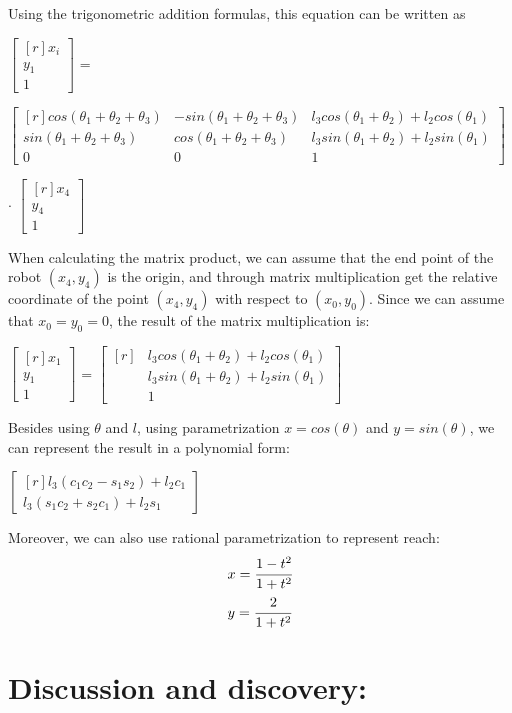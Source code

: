 \documentclass[11pt]{article}
\newcommand{\mat}[1]{
    $\begin{bmatrix*}[r]
        #1
    \end{bmatrix*}$
} %
\newcommand{\myalign}[1]{\begin{align*}#1\end{align*}}
\begin{document}
Using the trigonometric addition formulas, this equation can be written as
\begin{center}
  \mat{
    x_i \\
    y_1 \\
    1
  } = 
  \mat{
    cos(\theta_1+\theta_2+\theta_3) & -sin(\theta_1+\theta_2+\theta_3) & l_3cos(\theta_1+\theta_2) + l_2cos(\theta_1) \\
    sin(\theta_1+\theta_2+\theta_3) & cos(\theta_1+\theta_2+\theta_3) & l_3sin(\theta_1+\theta_2) + l_2sin(\theta_1) \\
    0 & 0 & 1
  }
  $\cdot$ \mat{
    x_{4} \\
    y_{4} \\
    1
  }
\end{center}
When calculating the matrix product, we can assume that the end point of the robot $(x_4, y_4)$ is the origin,
and through matrix multiplication get the relative coordinate of the point $(x_4, y_4)$ with respect to $(x_0, y_0)$.
Since we can assume that $x_0 = y_0 = 0$, the result of the matrix multiplication is:
\begin{center}
  \mat{
    x_1 \\
    y_1 \\
    1
  } = \mat{
    & l_3cos(\theta_1 + \theta_2) + l_2cos(\theta_1) \\
    & l_3sin(\theta_1 + \theta_2) + l_2sin(\theta_1) \\
    & 1
  } \\
\end{center}
Besides using $\theta$ and $l$, using parametrization $x = cos(\theta)$ and $y = sin(\theta)$, we can represent the result in a polynomial form:
\begin{center}
  \mat{
    l_3(c_1c_2-s_1s_2) + l_2c_1\\
    l_3(s_1c_2+s_2c_1) + l_2s_1
  }
\end{center}
Moreover, we can also use rational parametrization to represent reach:
\myalign{
  & x = \cfrac{1-t^2}{1+t^2} \\
  & y = \cfrac{2}{1+t^2}
}

\section{Discussion and discovery:}
\end{document}
